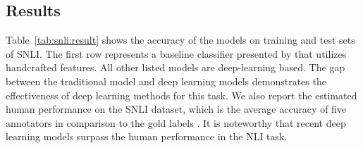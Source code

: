 \documentclass[11pt,a4paper]{article}
\begin{document}
	\subsection{Results}	
	
	\noindent Table~\ref{tab:snli:result} shows the accuracy of the models on training and test sets of SNLI. The first row represents a baseline classifier presented by \citet{snli} that utilizes handcrafted features. All other listed models are deep-learning based. The gap between the traditional model and deep learning models demonstrates the effectiveness of deep learning methods for this task. We also report the estimated human performance on the SNLI dataset, which is the average accuracy of five annotators in comparison to the gold labels \cite{gong2017}. It is noteworthy that recent deep learning models surpass the human performance in the NLI task.
	
\end{document}
